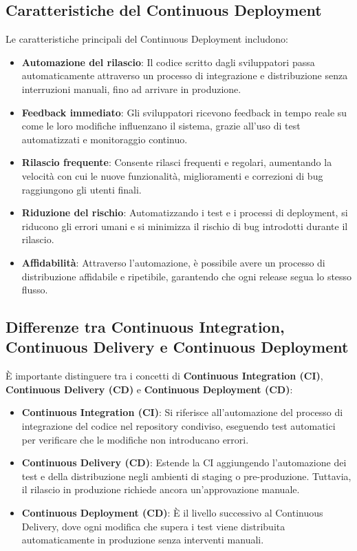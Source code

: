 \documentclass{article}
\begin{document}
\subsection{Caratteristiche del Continuous Deployment}
Le caratteristiche principali del Continuous Deployment includono:
\begin{itemize}
    \item \textbf{Automazione del rilascio}: Il codice scritto dagli sviluppatori passa automaticamente attraverso un processo di integrazione e distribuzione senza interruzioni manuali, fino ad arrivare in produzione.
    \item \textbf{Feedback immediato}: Gli sviluppatori ricevono feedback in tempo reale su come le loro modifiche influenzano il sistema, grazie all'uso di test automatizzati e monitoraggio continuo.
    \item \textbf{Rilascio frequente}: Consente rilasci frequenti e regolari, aumentando la velocità con cui le nuove funzionalità, miglioramenti e correzioni di bug raggiungono gli utenti finali.
    \item \textbf{Riduzione del rischio}: Automatizzando i test e i processi di deployment, si riducono gli errori umani e si minimizza il rischio di bug introdotti durante il rilascio.
    \item \textbf{Affidabilità}: Attraverso l'automazione, è possibile avere un processo di distribuzione affidabile e ripetibile, garantendo che ogni release segua lo stesso flusso.
\end{itemize}

\subsection{Differenze tra Continuous Integration, Continuous Delivery e Continuous Deployment}
È importante distinguere tra i concetti di \textbf{Continuous Integration (CI)}, \textbf{Continuous Delivery (CD)} e \textbf{Continuous Deployment (CD)}:
\begin{itemize}
    \item \textbf{Continuous Integration (CI)}: Si riferisce all'automazione del processo di integrazione del codice nel repository condiviso, eseguendo test automatici per verificare che le modifiche non introducano errori.
    \item \textbf{Continuous Delivery (CD)}: Estende la CI aggiungendo l'automazione dei test e della distribuzione negli ambienti di staging o pre-produzione. Tuttavia, il rilascio in produzione richiede ancora un'approvazione manuale.
    \item \textbf{Continuous Deployment (CD)}: È il livello successivo al Continuous Delivery, dove ogni modifica che supera i test viene distribuita automaticamente in produzione senza interventi manuali.
\end{itemize}
\end{document}

